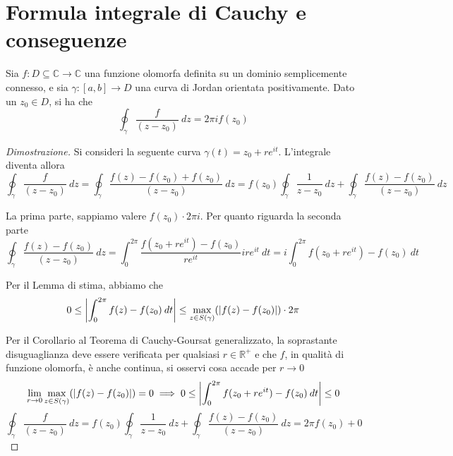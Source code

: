 \section{Formula integrale di Cauchy e conseguenze}

        \begin{definition}
            Sia $f: D \subseteq \mathbb{C} \rightarrow \mathbb{C}$ una funzione olomorfa definita su un dominio semplicemente connesso, e sia $\gamma: [a, b] \rightarrow D$ una curva di Jordan orientata positivamente.
            Dato un $z_{0} \in D$, si ha che
            \[
                \oint_{\gamma} \frac{f}{(z - z_{0})} \: dz = 2 \pi i f(z_{0})
            \]
        \end{definition}

        \begin{proof}[Dimostrazione]
            Si consideri la seguente curva $\gamma(t) = z_{0} + re^{it}$.
            L'integrale diventa allora
            \[
                \oint_{\gamma} \frac{f}{(z - z_{0})} \: dz = \oint_{\gamma} \frac{f(z) - f(z_{0}) + f(z_{0})}{(z - z_{0})} \: dz = f(z_{0}) \oint_{\gamma} \frac{1}{z - z_{0}} \: dz + \oint_{\gamma} \frac{f(z) - f(z_{0})}{(z - z_{0})} \: dz
            \]

            La prima parte, sappiamo valere $f(z_{0}) \cdot 2 \pi i$.
            Per quanto riguarda la seconda parte
            \[
                \oint_{\gamma} \frac{f(z) - f(z_{0})}{(z - z_{0})} \: dz = \int_{0}^{2 \pi} \frac{f(z_{0} + re^{it}) - f(z_{0})}{re^{it}} ire^{it} \: dt = i \int_{0}^{2 \pi} f(z_{0} + re^{it}) - f(z_{0}) \: dt
            \]

            Per il Lemma di stima, abbiamo che
            \[
                0 \leq \left\lvert \int_{0}^{2 \pi} f(z) - f(z_{0}) \: dt \right\rvert \leq \max_{z \in S(\gamma)}(\left\lvert f(z) - f(z_{0}) \right\rvert) \cdot 2 \pi
            \]

            Per il Corollario al Teorema di Cauchy-Goursat generalizzato, la soprastante disuguaglianza deve essere verificata per qualsiasi $r \in \mathbb{R}^{+}$ e che $f$, in qualità di funzione olomorfa, è anche continua, si osservi cosa accade per $r \rightarrow 0$
            \[
                \lim_{r \rightarrow 0} \max_{z \in S(\gamma)}(\left\lvert f(z) - f(z_{0}) \right\rvert) = 0 \implies 0 \leq \left\lvert \int_{0}^{2 \pi} f(z_{0} + re^{it}) - f(z_{0}) \: dt \right\rvert \leq 0
            \]
            \[
                \oint_{\gamma} \frac{f}{(z - z_{0})} \: dz = f(z_{0}) \oint_{\gamma} \frac{1}{z - z_{0}} \: dz + \oint_{\gamma} \frac{f(z) - f(z_{0})}{(z - z_{0})} \: dz = 2 \pi f(z_{0}) + 0
            \]
        \end{proof}

